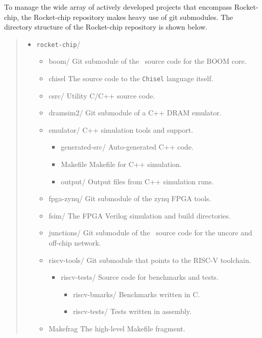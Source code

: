 To manage the wide array of actively developed projects that encompass Rocket-chip, the Rocket-chip repository makes heavy use of git submodules. The directory structure of the Rocket-chip repository is shown below. 

\begin{quote}
\begin{itemize}
\item \verb=rocket-chip=/\begin{itemize}

  \item boom/ {\footnotesize \color{red} Git submodule of the \Chisel\ source code for the BOOM core.}
  \item chisel {\footnotesize \color{red}  The source code to the {\tt Chisel} language itself.}
  \item csrc/ {\footnotesize \color{red} Utility C/C++ source code.}
  \item dramsim2/ {\footnotesize \color{red} Git submodule of a C++ DRAM emulator.}
  
  \item emulator/ {\footnotesize \color{red} C++ simulation tools and support.}\begin{itemize}
    \item generated-src/{\footnotesize \color{red} Auto-generated C++ code.} 
    \item Makefile {\footnotesize \color{red} Makefile for C++ simulation.}
    \item output/{\footnotesize \color{red} Output files from C++ simulation runs.} 
    \end{itemize}
  \item fpga-zynq/ {\footnotesize \color{red} Git submodule of the zynq FPGA tools.}
  \item fsim/ {\footnotesize \color{red} The FPGA Verilog simulation and build directories. }
  \item junctions/ {\footnotesize \color{red} Git submodule of the \Chisel\ source code for the uncore and off-chip network.}
 \item riscv-tools/{\footnotesize \color{red} Git submodule that points to the RISC-V toolchain.}
 \begin{itemize} 
  \item riscv-tests/ {\footnotesize \color{red} Source code for benchmarks and tests.} \begin{itemize}
    \item riscv-bmarks/ {\footnotesize \color{red}  Benchmarks written in C.}
    \item riscv-tests/ {\footnotesize \color{red}  Tests written in assembly.}
  \end{itemize}
  \end{itemize}
   \item Makefrag {\footnotesize \color{red}  The high-level Makefile fragment.}
   

\end{itemize}
\end{itemize}
\end{quote}
